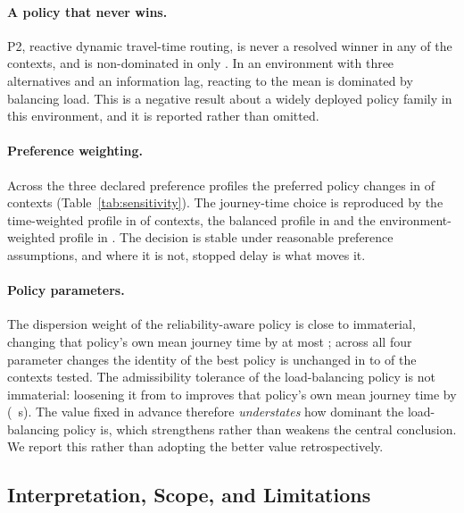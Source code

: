 \paragraph{A policy that never wins.} P2, reactive dynamic travel-time routing,
is never a resolved winner in any of the \NumContextsAnalysed{} contexts, and is
non-dominated in only \NumParetoPctPTwo{}. In an environment with three
alternatives and an information lag, reacting to the mean is dominated by
balancing load. This is a negative result about a widely deployed policy family
in this environment, and it is reported rather than omitted.

\paragraph{Preference weighting.} Across the three declared preference profiles
the preferred policy changes in \NumPrefChanges{} of contexts
(Table~\ref{tab:sensitivity}). The journey-time choice is reproduced by the
time-weighted profile in \NumPrefAgreeTime{} of contexts, the balanced profile
in \NumPrefAgreeBalanced{} and the environment-weighted profile in
\NumPrefAgreeEnvironment{}. The decision is stable under reasonable preference
assumptions, and where it is not, stopped delay is what moves it.

\paragraph{Policy parameters.} The dispersion weight of the reliability-aware
policy is close to immaterial, changing that policy's own mean journey time by
at most \NumLambdaMaxChangePct{}; across all four parameter changes the identity
of the best policy is unchanged in \NumWinnerStableMin{} to
\NumWinnerStableMax{} of the contexts tested. The admissibility tolerance of the
load-balancing policy is not immaterial: loosening it from \NumEpsFrozen{} to
\NumEpsAlt{} improves that policy's own mean journey time by \NumEpsGainPct{}
(\NumEpsGainSec~s). The value fixed in advance therefore \emph{understates} how
dominant the load-balancing policy is, which strengthens rather than weakens the
central conclusion. We report this rather than adopting the better value
retrospectively.

\subsection{Interpretation, Scope, and Limitations}

